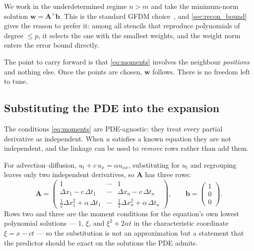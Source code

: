 We work in the underdetermined regime $n > m$ and take the minimum-norm
solution $\mathbf{w} = \mathbf{A}^{+}\mathbf{b}$. This is the standard GFDM
choice~\cite{benito2001,gavete2003}, and \cref{sec:recon_bound} gives the
reason to prefer it: among all stencils that reproduce polynomials of degree
$\le p$, it selects the one with the smallest weights, and the weight norm
enters the error bound directly.

The point to carry forward is that \eqref{eq:moments} involves the neighbour
\emph{positions} and nothing else. Once the points are chosen, $\mathbf{w}$
follows. There is no freedom left to tune.

\subsection{Substituting the PDE into the expansion}
\label{sec:recon_pde}

The conditions \eqref{eq:moments} are PDE-agnostic: they treat every partial
derivative as independent. When $u$ satisfies a known equation they are not
independent, and the linkage can be used to \emph{remove} rows rather than add
them.

For advection--diffusion, $u_t + c\,u_x = \alpha u_{xx}$, substituting for
$u_t$ and regrouping leaves only two independent derivatives, so
$\mathbf{A}$ has three rows:
%
\begin{equation}
  \mathbf{A} =
  \begin{pmatrix}
    1 & \cdots & 1 \\[2pt]
    \Delta x_1 - c\,\Delta t_1 & \cdots & \Delta x_n - c\,\Delta t_n \\[2pt]
    \tfrac12\Delta x_1^{2} + \alpha\,\Delta t_1 & \cdots &
    \tfrac12\Delta x_n^{2} + \alpha\,\Delta t_n
  \end{pmatrix},
  \qquad
  \mathbf{b} = \begin{pmatrix}1\\0\\0\end{pmatrix}.
  \label{eq:A_advdiff}
\end{equation}
%
Rows two and three are the moment conditions for the equation's own lowest
polynomial solutions --- $1$, $\xi$, and $\xi^{2} + 2\alpha t$ in the
characteristic coordinate $\xi = x - ct$ --- so the substitution is not an
approximation but a statement that the predictor should be exact on the
solutions the PDE admits.

